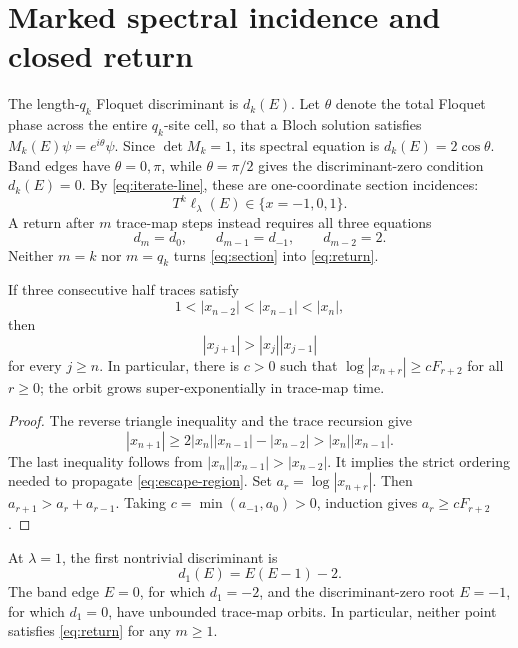 \section{Marked spectral incidence and closed return}

The length-\(q_k\) Floquet discriminant is \(d_k(E)\).  Let \(\theta\) denote
the total Floquet phase across the entire \(q_k\)-site cell, so that a Bloch
solution satisfies \(M_k(E)\psi=e^{i\theta}\psi\).  Since
\(\det M_k=1\), its spectral equation is
\(d_k(E)=2\cos\theta\).  Band edges have \(\theta=0,\pi\), while
\(\theta=\pi/2\) gives the discriminant-zero condition \(d_k(E)=0\).
By \eqref{eq:iterate-line}, these are one-coordinate section
incidences:
\begin{equation}
T^k\ell_\lambda(E)\in\{x=-1,0,1\}.
\label{eq:section}
\end{equation}
A return after \(m\) trace-map steps instead requires all three equations
\begin{equation}
d_m=d_0,\qquad d_{m-1}=d_{-1},\qquad d_{m-2}=2.
\label{eq:return}
\end{equation}
Neither \(m=k\) nor \(m=q_k\) turns \eqref{eq:section} into
\eqref{eq:return}.

\begin{lemma}
If three consecutive half traces satisfy
\begin{equation}
1<|x_{n-2}|<|x_{n-1}|<|x_n|,
\label{eq:escape-region}
\end{equation}
then
\[
|x_{j+1}|>|x_j||x_{j-1}|
\]
for every \(j\ge n\).  In particular, there is \(c>0\) such that
\(\log|x_{n+r}|\ge cF_{r+2}\) for all \(r\ge0\); the orbit grows
super-exponentially in trace-map time.
\end{lemma}

\begin{proof}
The reverse triangle inequality and the trace recursion give
\[
|x_{n+1}|\ge2|x_n||x_{n-1}|-|x_{n-2}|
>|x_n||x_{n-1}|.
\]
The last inequality follows from
\(|x_n||x_{n-1}|>|x_{n-2}|\).  It implies the strict ordering needed to
propagate \eqref{eq:escape-region}.  Set
\(a_r=\log|x_{n+r}|\).  Then \(a_{r+1}>a_r+a_{r-1}\).  Taking
\(c=\min(a_{-1},a_0)>0\), induction gives
\(a_r\ge cF_{r+2}\).
\end{proof}

\begin{proposition}
At \(\lambda=1\), the first nontrivial discriminant is
\begin{equation}
d_1(E)=E(E-1)-2.
\end{equation}
The band edge \(E=0\), for which \(d_1=-2\), and the discriminant-zero root
\(E=-1\),
for which \(d_1=0\), have unbounded trace-map orbits.  In particular, neither
point satisfies \eqref{eq:return} for any \(m\ge1\).
\end{proposition}

